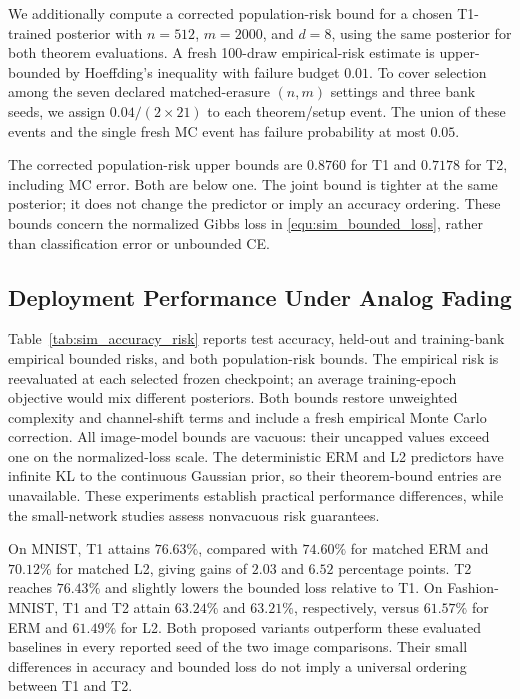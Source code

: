
We additionally compute a corrected population-risk bound for a chosen
T1-trained posterior with $n=512$, $m=2000$, and $d=8$, using the same
posterior for both theorem evaluations. A fresh 100-draw empirical-risk
estimate is upper-bounded by Hoeffding's inequality with failure budget
$0.01$. To cover selection among the seven declared matched-erasure
$(n,m)$ settings and three bank seeds, we assign $0.04/(2\times21)$ to each theorem/setup
event. The union of these events and the single fresh MC event has failure
probability at most $0.05$.

The corrected population-risk upper bounds are $0.8760$ for T1 and
$0.7178$ for T2, including MC error. Both are below one. The joint bound
is tighter at the same posterior; it does not change the predictor or
imply an accuracy ordering. These bounds concern the normalized Gibbs
loss in \eqref{equ:sim_bounded_loss}, rather than classification error or unbounded CE.



\subsection{Deployment Performance Under Analog Fading}
\label{sec:sim_performance}


Table~\ref{tab:sim_accuracy_risk} reports test accuracy, held-out and
training-bank empirical bounded risks, and both population-risk bounds.
The empirical risk is reevaluated at each selected frozen checkpoint;
an average training-epoch objective would mix different posteriors.
Both bounds restore unweighted complexity and channel-shift terms and
include a fresh empirical Monte Carlo correction. All image-model
bounds are vacuous: their uncapped values exceed one on the
normalized-loss scale. The deterministic ERM and L2 predictors have
infinite KL to the continuous Gaussian prior, so their theorem-bound
entries are unavailable. These experiments establish practical
performance differences, while the small-network studies assess
nonvacuous risk guarantees.

On MNIST, T1 attains $76.63\%$, compared with $74.60\%$ for
matched ERM and $70.12\%$ for matched L2, giving gains of $2.03$ and $6.52$
percentage points. T2 reaches $76.43\%$ and slightly lowers the bounded
loss relative to T1. On Fashion-MNIST, T1 and T2 attain $63.24\%$ and
$63.21\%$, respectively, versus $61.57\%$ for ERM and $61.49\%$ for L2.
Both proposed variants outperform these evaluated baselines in every
reported seed of the two image comparisons. Their small differences in
accuracy and bounded loss do not imply a universal ordering between T1
and T2.

